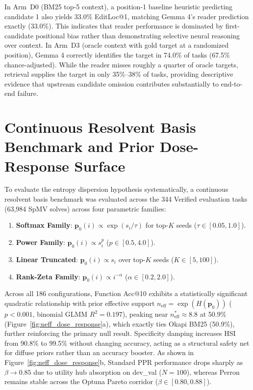 \documentclass[10pt]{article}
\begin{document}
In Arm~D0 (BM25 top-5 context), a position-1 baseline heuristic predicting candidate 1 also yields 33.0\% EditLoc@1, matching Gemma 4's reader prediction exactly (33.0\%). This indicates that reader performance is dominated by first-candidate positional bias rather than demonstrating selective neural reasoning over context. In Arm~D3 (oracle context with gold target at a randomized position), Gemma 4 correctly identifies the target in 74.0\% of tasks (67.5\% chance-adjusted). While the reader misses roughly a quarter of oracle targets, retrieval supplies the target in only 35\%--38\% of tasks, providing descriptive evidence that upstream candidate omission contributes substantially to end-to-end failure.

\section{Continuous Resolvent Basis Benchmark and Prior Dose-Response Surface}
\label{app:dose_response}

To evaluate the entropy dispersion hypothesis systematically, a continuous resolvent basis benchmark was evaluated across the 344 Verified evaluation tasks (63,984 SpMV solves) across four parametric families:
\begin{enumerate}[noitemsep,topsep=2pt,parsep=0pt,partopsep=0pt]
    \item \textbf{Softmax Family}: $\mathbf{p}_0(i) \propto \exp(s_i / \tau)$ for top-$K$ seeds ($\tau \in [0.05, 1.0]$).
    \item \textbf{Power Family}: $\mathbf{p}_0(i) \propto s_i^p$ ($p \in [0.5, 4.0]$).
    \item \textbf{Linear Truncated}: $\mathbf{p}_0(i) \propto s_i$ over top-$K$ seeds ($K \in [5, 100]$).
    \item \textbf{Rank-Zeta Family}: $\mathbf{p}_0(i) \propto i^{-\alpha}$ ($\alpha \in [0.2, 2.0]$).
\end{enumerate}
Across all 186 configurations, Function Acc@10 exhibits a statistically significant quadratic relationship with prior effective support $n_{\text{eff}} = \exp(H(\mathbf{p}_0))$ ($p < 0.001$, binomial GLMM $R^2 = 0.197$), peaking near $n_{\text{eff}}^* \approx 8.8$ at 50.9\% (Figure~\ref{fig:neff_dose_response}a), which exactly ties Okapi BM25 (50.9\%), further reinforcing the primary null result. Specificity damping increases HSI from 90.8\% to 99.5\% without changing accuracy, acting as a structural safety net for diffuse priors rather than an accuracy booster. As shown in Figure~\ref{fig:neff_dose_response}b, Standard PPR performance drops sharply as $\beta \to 0.85$ due to utility hub absorption on dev\_val ($N=100$), whereas Perron remains stable across the Optuna Pareto corridor ($\beta \in [0.80, 0.88]$).
\end{document}
